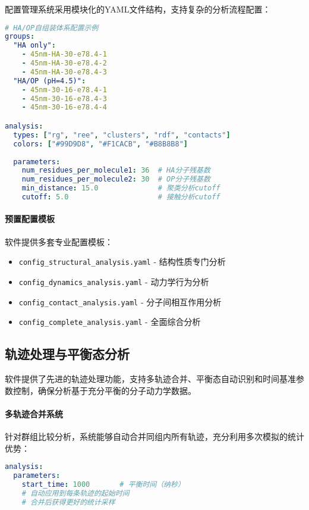 配置管理系统采用模块化的YAML文件结构，支持复杂的分析流程配置：

\begin{lstlisting}[language=yaml,style=blockstyle]
# HA/OP自组装体系配置示例
groups:
  "HA only":
    - 45nm-HA-30-e78.4-1
    - 45nm-HA-30-e78.4-2
    - 45nm-HA-30-e78.4-3
  "HA/OP (pH=4.5)":
    - 45nm-30-16-e78.4-1
    - 45nm-30-16-e78.4-3
    - 45nm-30-16-e78.4-4

analysis:
  types: ["rg", "ree", "clusters", "rdf", "contacts"]
  colors: ["#99D9D8", "#F1CACB", "#B8B8B8"]
  
  parameters:
    num_residues_per_molecule1: 36  # HA分子残基数
    num_residues_per_molecule2: 30  # OP分子残基数
    min_distance: 15.0              # 聚类分析cutoff
    cutoff: 5.0                     # 接触分析cutoff
\end{lstlisting}

\paragraph{预置配置模板}

软件提供多套专业配置模板：
\begin{itemize}
    \item \lstinline|config_structural_analysis.yaml| - 结构性质专门分析
    \item \lstinline|config_dynamics_analysis.yaml| - 动力学行为分析  
    \item \lstinline|config_contact_analysis.yaml| - 分子间相互作用分析
    \item \lstinline|config_complete_analysis.yaml| - 全面综合分析
\end{itemize}

\subsection{轨迹处理与平衡态分析}
\label{subsec:trajectory_handling}

软件提供了先进的轨迹处理功能，支持多轨迹合并、平衡态自动识别和时间基准参数控制，确保分析基于充分平衡的分子动力学数据。

\paragraph{多轨迹合并系统}

针对群组比较分析，系统能够自动合并同组内所有轨迹，充分利用多次模拟的统计优势：

\begin{lstlisting}[language=yaml,style=blockstyle]
analysis:
  parameters:
    start_time: 1000       # 平衡时间（纳秒）
    # 自动应用到每条轨迹的起始时间
    # 合并后获得更好的统计采样
\end{lstlisting}

